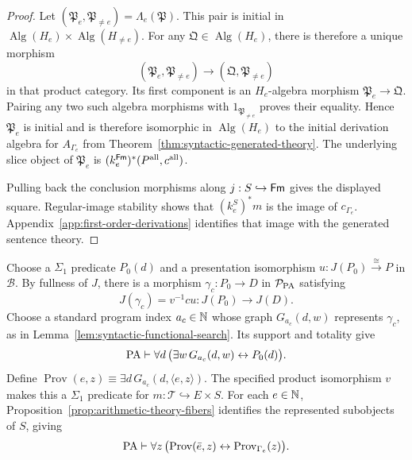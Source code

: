 \begin{proof}
Let $(\mathfrak P_e,\mathfrak P_{\ne e})=\Lambda_e(\mathfrak P)$.
This pair is initial in
$\operatorname{Alg}(H_e)\times\operatorname{Alg}(H_{\ne e})$.
For any $\mathfrak Q\in\operatorname{Alg}(H_e)$, there is
therefore a unique morphism
\[
 (\mathfrak P_e,\mathfrak P_{\ne e})\longrightarrow
 (\mathfrak Q,\mathfrak P_{\ne e})
\]
in that product category. Its first component is an
$H_e$-algebra morphism $\mathfrak P_e\to\mathfrak Q$.
Pairing any two such algebra morphisms with
$1_{\mathfrak P_{\ne e}}$ proves their equality. Hence
$\mathfrak P_e$ is initial and is therefore isomorphic in
$\operatorname{Alg}(H_e)$ to the initial derivation algebra for
$A_{\Gamma_e}$ from Theorem~\ref{thm:syntactic-generated-theory}.
The underlying slice object of $\mathfrak P_e$ is
$(k_e^{\mathsf{Fm}})^*(P^{\mathrm{all}},c^{\mathrm{all}})$.

Pulling back the conclusion morphisms along $j:S\hookrightarrow\mathsf{Fm}$
gives the displayed square. Regular-image stability shows that
$(k_e^S)^*m$ is the image of $c_{\Gamma_e}$.
Appendix~\ref{app:first-order-derivations} identifies that image
with the generated sentence theory.
\end{proof}

Choose a $\Sigma_1$ predicate $P_0(d)$ and a presentation
isomorphism $u:J(P_0)\xrightarrow{\cong}P$ in $\mathcal B$.
By fullness of $J$, there is a morphism
$\gamma_c:P_0\to D$ in $\mathcal P_{\mathrm{PA}}$ satisfying
\[
 J(\gamma_c)=v^{-1}cu:J(P_0)\longrightarrow J(D).
\]
Choose a standard program index $a_c\in\mathbb N$ whose graph
$G_{a_c}(d,w)$ represents $\gamma_c$, as in
Lemma~\ref{lem:syntactic-functional-search}. Its support and
totality give
\[
 \mathrm{PA}\vdash\forall d\,
     \bigl(\exists w\,G_{a_c}(d,w)\leftrightarrow P_0(d)\bigr).
\]
Define $\operatorname{Prov}(e,z)
\equiv\exists d\,G_{a_c}(d,\langle e,z\rangle)$.
The specified product isomorphism $v$ makes this a $\Sigma_1$
predicate for $m:\mathcal T\hookrightarrow E\times S$.
For each $e\in\mathbb N$,
Proposition~\ref{prop:arithmetic-theory-fibers} identifies the
represented subobjects of $S$, giving
\[
 \mathrm{PA}\vdash\forall z\,
   \bigl(\operatorname{Prov}(\bar e,z)
       \leftrightarrow\operatorname{Prov}_{\Gamma_e}(z)\bigr).
\]
